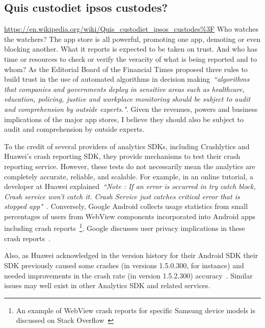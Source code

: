 \subsection{Quis custodiet ipsos custodes?}
\url{https://en.wikipedia.org/wiki/Quis_custodiet_ipsos_custodes\%3F}
Who watches the watchers? The app store is all powerful, promoting one app, demoting or even blocking another. What it reports is expected to be taken on trust. And who has time or resources to check or verify the veracity of what is being reported and to whom? As the Editorial Board of the Financial Times proposed three rules to build trust in the use of automated algorithms in decision making~\emph{``algorithms that companies and governments deploy in sensitive areas such as healthcare, education, policing, justice and workplace monitoring should be subject to audit and comprehension by outside experts."}\citep{ft2021_building_trust_in_ai_systems_is_essential}. Given the revenues, powers and business implications of the major app stores, I believe they should also be subject to audit and comprehension by outside experts.

To the credit of several providers of analytics SDKs, including Crashlytics and Huawei's crash reporting SDK, they provide mechanisms to test their crash reporting service. However, these tests do not necessarily mean the analytics are completely accurate, reliable, and scalable. For example, in an online tutorial, a developer at Huawei explained~\emph{``Note : If an error is occurred in try catch block, Crash service won’t catch it. Crash Service just catches critical error that is stopped app"}~\citep{huawei2020_appgallery_connect_crash_service_article_on_medium}. Conversely, Google Android collects usage statistics from small percentages of users from WebView components incorporated into Android apps including crash reports~\footnote{An example of WebView crash reports for specific Samsung device models is discussed on Stack Overflow~\citep{ebling2018_so_s9_specific_webview_device_crash_report}}. Google discusses user privacy implications in these crash reports~\citep{android_webview_privacy}.

Also, as Huawei acknowledged in the version history for their Android SDK their SDK previously caused some crashes (in versions 1.5.0.300, for instance) and needed improvements in the crash rate (in version 1.5.2.300) accuracy~\citep{huawei_android_crashservice_sdk_version_change_history}. Similar issues may well exist in other Analytics SDK and related services. 

